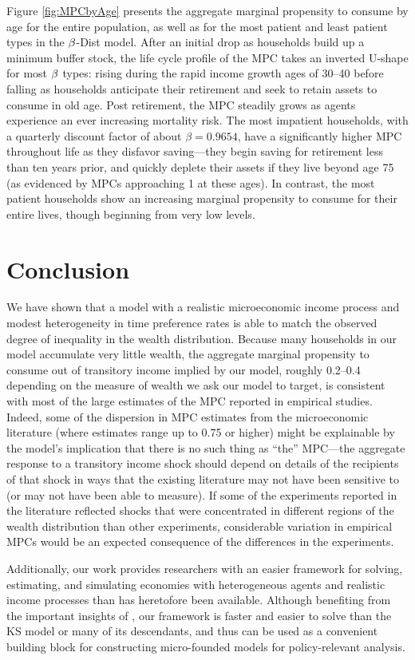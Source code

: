 \documentclass[12pt,titlepage]{econtex}
\begin{document}
Figure \ref{fig:MPCbyAge} presents the aggregate marginal propensity to consume by age for the entire population, as well as for the most patient and least patient types in the $\beta$-Dist model.  After an initial drop as households build up a minimum buffer stock, the life cycle profile of the MPC takes an inverted U-shape for most $\beta$ types: rising during the rapid income growth ages of 30--40 before falling as households anticipate their retirement and seek to retain assets to consume in old age.  Post retirement, the MPC steadily grows as agents experience an ever increasing mortality risk.  The most impatient households, with a quarterly discount factor of about $\beta = 0.9654$, have a significantly higher MPC throughout life as they disfavor saving---they begin saving for retirement less than ten years prior, and quickly deplete their assets if they live beyond age 75 (as evidenced by MPCs approaching 1 at these ages).  In contrast, the most patient households show an increasing marginal propensity to consume for their entire lives, though beginning from very low levels.

\section{Conclusion}\label{sec:Conclusion}

We have shown that a model with a realistic microeconomic income
process and modest heterogeneity in time preference rates is able to
match the observed degree of inequality in the wealth distribution.
Because many households in our model accumulate very little wealth,
the aggregate marginal propensity to consume out of transitory income
implied by our model, roughly 0.2--0.4 depending on the measure of
wealth we ask our model to target, is consistent with most of the large estimates of
the MPC reported in empirical studies. Indeed, some of the
dispersion in MPC estimates from the microeconomic literature (where
estimates range up to 0.75 or higher) might be explainable by the
model's implication that there is no such thing as ``the'' MPC---the
aggregate response to a transitory income shock should depend on
details of the recipients of that shock in ways that the existing
literature may not have been sensitive to (or may not have been able
to measure).  If some of the experiments reported in the literature
reflected shocks that were concentrated in different regions of the
wealth distribution than other experiments, considerable variation in
empirical MPCs would be an expected consequence of the differences
in the experiments.

Additionally, our work provides researchers with an easier framework
for solving, estimating, and simulating economies with heterogeneous
agents and realistic income processes than has heretofore been
available. Although benefiting from the important insights of \citet{ksHetero},
our framework is faster and easier to solve than the KS model or many of its
descendants, and thus can be used as a convenient building block for
constructing micro-founded models for policy-relevant analysis.

\small

\end{document}
